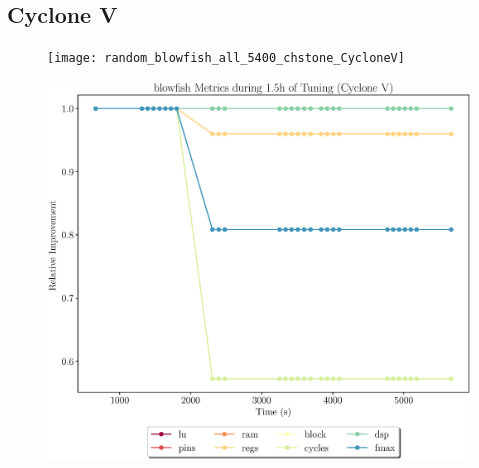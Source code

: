 \documentclass[12pt, a4paper]{article}
\begin{document}
\subsection{Cyclone V}

\noindent

\begin{figure}[htpb]
    \centering
    \noindent
    \begin{minipage}{.48\textwidth}
        \centering
        \texttt{[image: random\_blowfish\_all\_5400\_chstone\_CycloneV]}
    \end{minipage}%
    \hfill
    \begin{minipage}{.48\textwidth}
        \centering
        \includegraphics[scale=.25]{blowfish_all_5400_chstone_CycloneV}
    \end{minipage}%


\end{figure}
\end{document}
